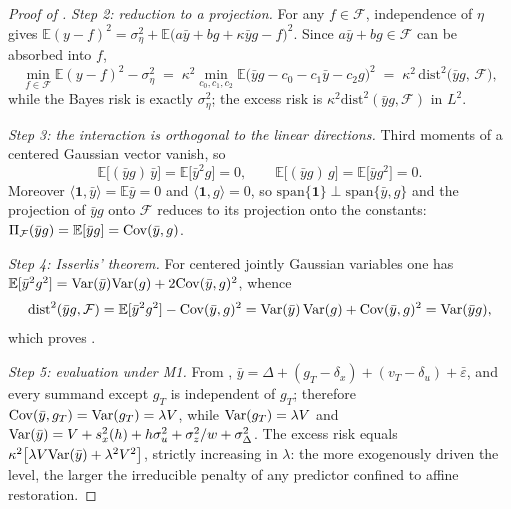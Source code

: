 \begin{proof}[Proof of ]
\emph{Step 2: reduction to a projection.}
For any $f \in \mathcal{F}$, independence of $\eta$ gives $\mathbb{E}(y - f)^2 = \sigma_\eta^2 + \mathbb{E}\big(a\bar y + bg + \kappa \bar y g - f\big)^2$. Since $a\bar y + bg \in \mathcal{F}$ can be absorbed into $f$,
\begin{equation}
  \min_{f \in \mathcal{F}} \mathbb{E}(y - f)^2 - \sigma_\eta^2
  \;=\; \kappa^2 \min_{c_0,c_1,c_2} \mathbb{E}\big(\bar y g - c_0 - c_1 \bar y - c_2 g\big)^2
  \;=\; \kappa^2\, \mathrm{dist}^2\big(\bar y g,\, \mathcal{F}\big) ,
\end{equation}
while the Bayes risk is exactly $\sigma_\eta^2$; the excess risk is $\kappa^2 \mathrm{dist}^2(\bar y g, \mathcal{F})$ in $L^2$.

\emph{Step 3: the interaction is orthogonal to the linear directions.}
Third moments of a centered Gaussian vector vanish, so
\begin{equation}
  \mathbb{E}\big[(\bar y g)\, \bar y\big] = \mathbb{E}\big[\bar y^2 g\big] = 0,
  \qquad
  \mathbb{E}\big[(\bar y g)\, g\big] = \mathbb{E}\big[\bar y g^2\big] = 0 .
\end{equation}
Moreover $\langle \mathbf{1}, \bar y\rangle = \mathbb{E}\bar y = 0$ and $\langle \mathbf{1}, g\rangle = 0$, so $\mathrm{span}\{\mathbf 1\} \perp \mathrm{span}\{\bar y, g\}$ and the projection of $\bar y g$ onto $\mathcal{F}$ reduces to its projection onto the constants:
$\Pi_{\mathcal{F}}(\bar y g) = \mathbb{E}[\bar y g] = \mathrm{Cov}(\bar y, g)$.

\emph{Step 4: Isserlis' theorem.}
For centered jointly Gaussian variables one has $\mathbb{E}[\bar y^2 g^2] = \mathrm{Var}(\bar y)\mathrm{Var}(g) + 2\mathrm{Cov}(\bar y, g)^2$, whence
\begin{equation}\label{eq:app-isserlis}
  \mathrm{dist}^2(\bar y g, \mathcal{F})
  = \mathbb{E}[\bar y^2 g^2] - \mathrm{Cov}(\bar y,g)^2
  = \mathrm{Var}(\bar y)\,\mathrm{Var}(g) + \mathrm{Cov}(\bar y, g)^2
  = \mathrm{Var}(\bar y g) ,
\end{equation}
which proves .

\emph{Step 5: evaluation under M1.}
From , $\bar y = \Delta + (g_T - \delta_x) + (v_T - \delta_u) + \bar\varepsilon$, and every summand except $g_T$ is independent of $g_T$; therefore $\mathrm{Cov}(\bar y, g_T) = \mathrm{Var}(g_T) = \lambda V$, while $\mathrm{Var}(g_T) = \lambda V$ and $\mathrm{Var}(\bar y) = V + s_x^2(h) + h\sigma_u^2 + \sigma_z^2/w + \sigma_\Delta^2$. The excess risk equals $\kappa^2\big[\lambda V \mathrm{Var}(\bar y) + \lambda^2 V^2\big]$, strictly increasing in $\lambda$: the more exogenously driven the level, the larger the irreducible penalty of any predictor confined to affine restoration.


\end{proof}
